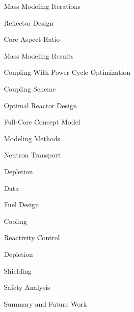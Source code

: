 \documentclass{report}
\begin{document}
\begin{outline}
\begin{outline}
\begin{outline}
\begin{outline}
              \end{outline}
          \end{outline}
          \item { Mass Modeling Iterations }
              \begin{outline}
              \item { Reflector Design }
              \item { Core Aspect Ratio }
              \end{outline}
          \item { Mass Modeling Results }
      \end{outline}
  \item { Coupling With Power Cycle Optimization }
        \begin{outline}
        \item { Coupling Scheme }
        \item { Optimal Reactor Design }
        \end{outline}
  \item { Full-Core Concept Model }
        \begin{outline}
        \item { Modeling Methods }
            \begin{outline}
            \item { Neutron Transport }
            \item { Depletion }
            \item { Data }
            \end{outline}
        \item { Fuel Design }
        \item { Cooling }
        \item { Reactivity Control }
        \item { Depletion }
        \item { Shielding }
        \item { Safety Analysis }
        \end{outline}
  \item { Summary and Future Work }
\end{outline}
\end{document}
